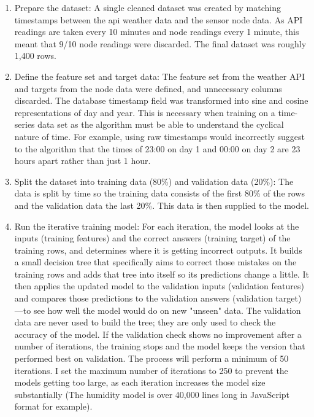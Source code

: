 \begin{enumerate}
    \item Prepare the dataset: A single cleaned dataset was created by matching
          timestamps between the api weather data and the sensor node data. As
          API readings are taken every 10 minutes and node readings every 1
          minute, this meant that 9/10 node readings were discarded. The final
          dataset was roughly 1,400 rows.
    \item Define the feature set and target data: The feature set from the
          weather API and targets from the node data were defined, and
          unnecessary columns discarded. The database timestamp field was
          transformed into sine and cosine representations of day and year. This
          is necessary when training on a time-series data set as the algorithm
          must be able to understand the cyclical nature of time. For example,
          using raw timestamps would incorrectly suggest to the algorithm that
          the times of 23:00 on day 1 and 00:00 on day 2 are 23 hours apart
          rather than just 1 hour.
    \item Split the dataset into training data (80\%) and validation data
          (20\%): The data is split by time so the training data consists of the
          first 80\% of the rows and the validation data the last 20\%.  This
          data is then supplied to the model.
    \item Run the iterative training model: For each iteration, the model looks
          at the inputs (training features) and the correct answers (training
          target) of the training rows, and determines where it is getting
          incorrect outputs. It builds a small decision tree that specifically
          aims to correct those mistakes on the training rows and adds that tree
          into itself so its predictions change a little. It then applies the
          updated model to the validation inputs (validation features) and
          compares those predictions to the validation answers (validation
          target) —to see how well the model would do on new "unseen" data. The
          validation data are never used to build the tree; they are only used
          to check the accuracy of the model. If the validation check shows no
          improvement after a number of iterations, the training stops and the
          model keeps the version that performed best on validation.  The
          process will perform a minimum of 50 iterations. I set the maximum
          number of iterations to 250 to prevent the models getting too large,
          as each iteration increases the model size substantially (The humidity
          model is over 40,000 lines long in JavaScript format for example).
\end{enumerate}


